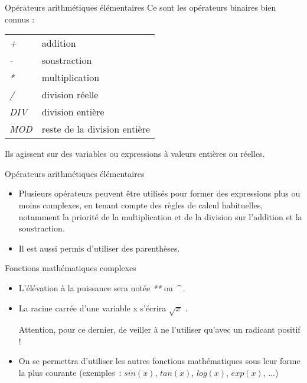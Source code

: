 \begin{frame}{Opérateurs arithmétiques élémentaires}
	Ce sont les opérateurs binaires bien connus :
	
	\bigskip
	
	\begin{tabular}{p{1.6cm}|p{11.5cm}}
	\raggedleft  \textit{+} & addition\\
	\raggedleft  \textit{-} & soustraction\\
	\raggedleft  \textit{*} & multiplication\\
	\raggedleft  \textit{/} & division réelle\\
	\raggedleft  \textit{DIV} & division entière\\
	\raggedleft  \textit{MOD} & reste de la division entière\\		
	\end{tabular}
	
	\bigskip
	
	Ils agissent sur des variables ou expressions à valeurs entières ou
	réelles. 
	
\end{frame}

\begin{frame}{Opérateurs arithmétiques élémentaires}
	\begin{itemize}
		\item
		Plusieurs opérateurs peuvent être utilisés pour former des
		expressions plus ou moins complexes, en tenant compte des règles de
		calcul habituelles, notamment la priorité de la multiplication et de la
		division sur l’addition et la soustraction. 
		
	\bigskip
	
		\item
		Il est aussi permis	d’utiliser des parenthèses.
	\end{itemize}
\end{frame}

\begin{frame}{Fonctions mathématiques complexes}
	\begin{itemize}
	\item
	L’élévation à la puissance sera notée \textit{**} ou
	\textit{\^{}} . 
	
	\bigskip
	
	\item
	La racine carrée d’une variable x s'écrira
	$\sqrt{x}$ \textit{.} 
	
	Attention, pour ce dernier, de veiller
	à ne l’utiliser qu’avec un radicant positif !

	\bigskip
	
	\item
	On se permettra d'utiliser les autres
	fonctions mathématiques sous leur forme la plus courante
	(exemples~:	$sin(x)$, $tan(x)$, $log(x)$, $exp(x)$, ...)
	\end{itemize}
\end{frame}


